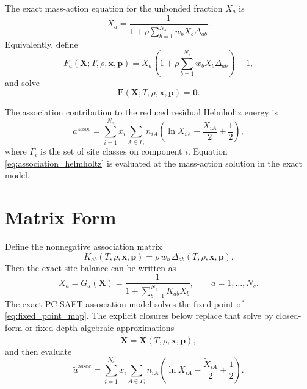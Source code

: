 \documentclass[12pt,letterpaper]{article}
\newcommand{\assoc}{\mathrm{assoc}}
\begin{document}
The exact mass-action equation for the unbonded fraction \(X_a\) is
\begin{equation}
  X_a =
  \frac{1}{
    1 + \rho \sum_{b=1}^{N_s} w_b X_b \Delta_{ab}
  }.
  \label{eq:exact_mass_action}
\end{equation}
Equivalently, define
\begin{equation}
  F_a(\mathbf{X};T,\rho,\mathbf{x},\mathbf{p}) =
  X_a\left(1+\rho\sum_{b=1}^{N_s}w_b X_b\Delta_{ab}\right)-1,
  \label{eq:mass_action_residual}
\end{equation}
and solve
\begin{equation}
  \mathbf{F}(\mathbf{X};T,\rho,\mathbf{x},\mathbf{p})=\mathbf{0}.
  \label{eq:mass_action_system}
\end{equation}

The association contribution to the reduced residual Helmholtz energy is
\begin{equation}
  a^\assoc =
  \sum_{i=1}^{N_c} x_i
  \sum_{A\in\Gamma_i} n_{iA}
  \left(
    \ln X_{iA} - \frac{X_{iA}}{2} + \frac{1}{2}
  \right),
  \label{eq:association_helmholtz}
\end{equation}
where \(\Gamma_i\) is the set of site classes on component \(i\). Equation
\eqref{eq:association_helmholtz} is evaluated at the mass-action solution in
the exact model.

\section{Matrix Form}

Define the nonnegative association matrix
\begin{equation}
  K_{ab}(T,\rho,\mathbf{x},\mathbf{p})
  =
  \rho\,w_b\,\Delta_{ab}(T,\rho,\mathbf{x},\mathbf{p}).
  \label{eq:k_matrix}
\end{equation}
Then the exact site balance can be written as
\begin{equation}
  X_a = G_a(\mathbf{X})
  =
  \frac{1}{1+\sum_{b=1}^{N_s}K_{ab}X_b},
  \qquad a=1,\dots,N_s.
  \label{eq:fixed_point_map}
\end{equation}
The exact PC-SAFT association model solves the fixed point of
\eqref{eq:fixed_point_map}. The explicit closures below replace that solve by
closed-form or fixed-depth algebraic approximations
\begin{equation}
  \widetilde{\mathbf{X}}
  =
  \widetilde{\mathbf{X}}(T,\rho,\mathbf{x},\mathbf{p}),
  \label{eq:explicit_x_general}
\end{equation}
and then evaluate
\begin{equation}
  \widetilde{a}^{\assoc} =
  \sum_{i=1}^{N_c} x_i
  \sum_{A\in\Gamma_i} n_{iA}
  \left(
    \ln \widetilde{X}_{iA}
    - \frac{\widetilde{X}_{iA}}{2}
    + \frac{1}{2}
  \right).
  \label{eq:approx_association_helmholtz}
\end{equation}
\end{document}

